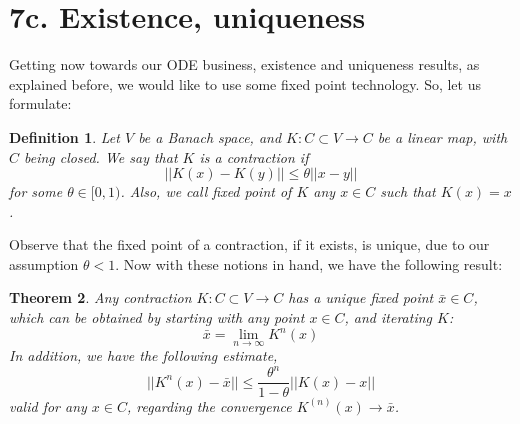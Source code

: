 \documentclass[12pt]{amsbook}
\newtheorem{theorem}{Theorem}[chapter]
\newtheorem{definition}[theorem]{Definition}
\begin{document}
\section*{7c. Existence, uniqueness}

Getting now towards our ODE business, existence and uniqueness results, as explained before, we would like to use some fixed point technology. So, let us formulate:

\begin{definition}
Let $V$ be a Banach space, and $K:C\subset V\to C$ be a linear map, with $C$ being closed. We say that $K$ is a contraction if 
$$||K(x)-K(y)||\leq\theta||x-y||$$
for some $\theta\in[0,1)$. Also, we call fixed point of $K$ any $x\in C$ such that $K(x)=x$.
\end{definition}

Observe that the fixed point of a contraction, if it exists, is unique, due to our assumption $\theta<1$. Now with these notions in hand, we have the following result:

\begin{theorem}
Any contraction $K:C\subset V\to C$ has a unique fixed point $\bar{x}\in C$, which can be obtained by starting with any point $x\in C$, and iterating $K$:
$$\bar{x}=\lim_{n\to\infty}K^n(x)$$
In addition, we have the following estimate,
$$||K^n(x)-\bar{x}||\leq\frac{\theta^n}{1-\theta}||K(x)-x||$$
valid for any $x\in C$, regarding the convergence $K^{(n)}(x)\to\bar{x}$.
\end{theorem}
\end{document}
